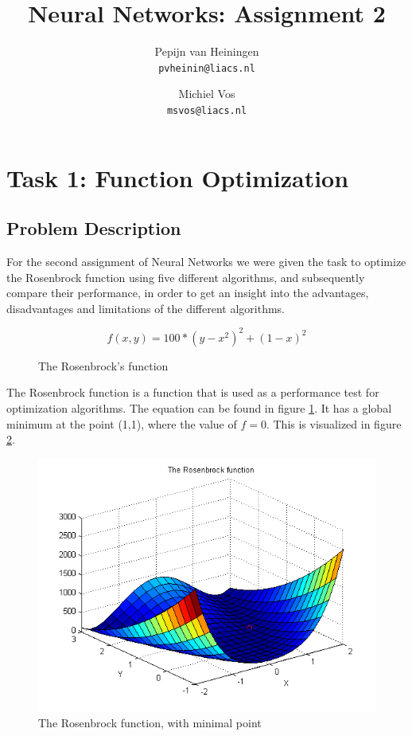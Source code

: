 \documentclass{article}
\title{Neural Networks: Assignment 2}
\author{Pepijn van Heiningen \\ \texttt{pvheinin@liacs.nl} \and Michiel Vos \\ \texttt{msvos@liacs.nl}}
\begin{document}
\maketitle

\section{Task 1: Function Optimization}
\subsection{Problem Description}
For the second assignment of Neural Networks we were given the task to optimize the Rosenbrock function using five different algorithms, and subsequently compare their performance, in order to get an insight into the advantages, disadvantages and limitations of the different algorithms.\\
\begin{figure}[H]
\[f(x,y) = 100 * (y-x^2)^2 + (1 - x)^2\]
\caption{The Rosenbrock's function}
\label{eq:rosen}
\end{figure}
The Rosenbrock function is a function that is used as a performance test for optimization algorithms. The equation can be found in figure \ref{eq:rosen}. It has a global minimum at the point (1,1), where the value of $f = 0$. This is visualized in figure \ref{fig:rosenbrock}. \\

\begin{figure}[H]
	\centering
		\includegraphics[scale=0.8]{rosenbrock.png}
	\caption{The Rosenbrock function, with minimal point}
	\label{fig:rosenbrock}
\end{figure}
\end{document}
